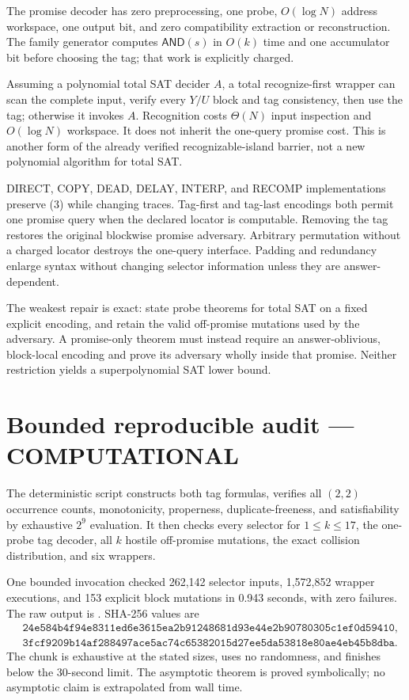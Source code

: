\documentclass[11pt]{article}
\newcommand{\AND}{\mathsf{AND}}
\newcommand{\COMP}{\textbf{COMPUTATIONAL}}
\begin{document}
The promise decoder has zero preprocessing, one probe, $O(\log N)$ address
workspace, one output bit, and zero compatibility extraction or
reconstruction.  The family generator computes $\AND(s)$ in $O(k)$ time and
one accumulator bit before choosing the tag; that work is explicitly charged.

Assuming a polynomial total SAT decider $A$, a total recognize-first wrapper
can scan the complete input, verify every $Y/U$ block and tag consistency,
then use the tag; otherwise it invokes $A$.  Recognition costs $\Theta(N)$
input inspection and $O(\log N)$ workspace.  It does not inherit the
one-query promise cost.  This is another form of the already verified
recognizable-island barrier, not a new polynomial algorithm for total SAT.

DIRECT, COPY, DEAD, DELAY, INTERP, and RECOMP implementations preserve (3)
while changing traces.  Tag-first and tag-last encodings both permit one
promise query when the declared locator is computable.  Removing the tag
restores the original blockwise promise adversary.  Arbitrary permutation
without a charged locator destroys the one-query interface.  Padding and
redundancy enlarge syntax without changing selector information unless they
are answer-dependent.

The weakest repair is exact: state probe theorems for total SAT on a fixed
explicit encoding, and retain the valid off-promise mutations used by the
adversary.  A promise-only theorem must instead require an answer-oblivious,
block-local encoding and prove its adversary wholly inside that promise.
Neither restriction yields a superpolynomial SAT lower bound.

\section{Bounded reproducible audit --- \COMP}

The deterministic script
constructs both tag formulas, verifies all $(2,2)$ occurrence counts,
monotonicity, properness, duplicate-freeness, and satisfiability by exhaustive
$2^9$ evaluation.  It then checks every selector for $1\le k\le17$, the
one-probe tag decoder, all $k$ hostile off-promise mutations, the exact
collision distribution, and six wrappers.

One bounded invocation checked 262,142 selector inputs, 1,572,852 wrapper
executions, and 153 explicit block mutations in 0.943 seconds, with zero
failures.  The raw output is
.
SHA-256 values are
\begin{align*}
&\texttt{24e584b4f94e8311ed6e3615ea2b91248681d93e44e2b90780305c1ef0d59410},\\
&\texttt{3fcf9209b14af288497ace5ac74c65382015d27ee5da53818e80ae4eb45b8dba}.
\end{align*}
The chunk is exhaustive at the stated sizes, uses no randomness, and finishes
below the 30-second limit.  The asymptotic theorem is proved symbolically; no
asymptotic claim is extrapolated from wall time.
\end{document}
